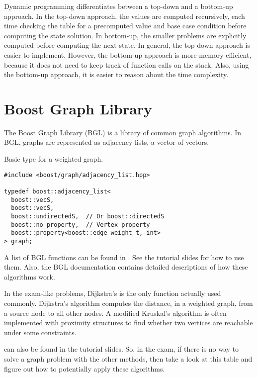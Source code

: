 \documentclass[justified,nobib]{tufte-handout}
\begin{document}

Dynamic programming differentiates between a top-down and a bottom-up approach.
In the top-down approach, the values are computed recursively, each time
checking the table for a precomputed value and base case condition before
computing the state solution. In bottom-up, the smaller problems are explicitly
computed before computing the next state. In general, the top-down approach is
easier to implement. However, the bottom-up approach is more memory efficient,
because it does not need to keep track of function calls on the stack. Also,
using the bottom-up approach, it is easier to reason about the time complexity.

\section{Boost Graph Library}

The Boost Graph Library (BGL) is a library of common graph algorithms. In BGL,
graphs are represented as adjacency lists, \ie a vector of vectors.

\begin{listing}
  \caption{Basic type for a weighted graph.}
  \begin{lstlisting}
#include <boost/graph/adjacency_list.hpp>

typedef boost::adjacency_list<
  boost::vecS,
  boost::vecS,
  boost::undirectedS,  // Or boost::directedS
  boost::no_property,  // Vertex property
  boost::property<boost::edge_weight_t, int>
> graph;
  \end{lstlisting}
\end{listing}

A list of BGL functions can be found in . See the tutorial
slides for how to use them. Also, the BGL documentation contains detailed
descriptions of how these algorithms work.

In the exam-like problems, Dijkstra's is the only function actually used
commonly. Dijkstra's algorithm computes the distance, in a weighted graph, from
a source node to all other nodes. A modified Kruskal's algorithm is often
implemented with proximity structures to find whether two vertices are reachable
under some constraints.

 can also be found in the tutorial slides. So, in the exam, if there is no way to
solve a graph problem with the other methods, then take a look at this table and
figure out how to potentially apply these algorithms. 
\end{document}
